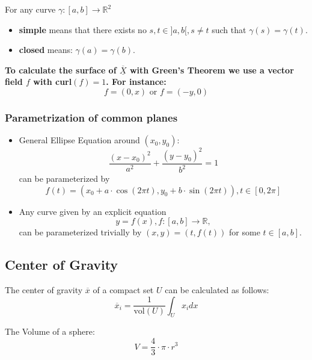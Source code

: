 \documentclass[a4paper,fontsize = 10pt]{article}
\def\R{\mathbb{R}}
\def\X{\underline{\overline{X}}}
\begin{document}
For any curve $\gamma: [a,b] \to \R^2$ 
\begin{itemize}
  \item \textbf{simple} means that there exists no $s, t \in ]a,b[, s \neq t$ such that $\gamma(s) = \gamma(t)$. 
  \item \textbf{closed} means: $\gamma(a) = \gamma(b)$.
\end{itemize}
\textbf{To calculate the surface of $\X$ with Green's Theorem we use a vector field $f$ with curl$(f) = 1$. For instance: \[f = (0,x) \text{ or } f = (-y, 0)\]}

\subsubsection*{Parametrization of common planes}
\begin{itemize}
  \item General Ellipse Equation around $(x_0, y_0)$: $$\frac{(x-x_0)^2}{a^2} + \frac{(y-y_0)^2}{b^2} = 1$$ can be parameterized by $$f(t) = (x_0 + a \cdot \cos(2\pi t), y_0 + b \cdot \sin(2\pi t)), t \in [0, 2\pi]$$
  \item Any curve given by an explicit equation $$y = f(x), f: [a,b] \to \R,$$ can be parameterized trivially by $(x, y) = (t, f(t))$ for some $t \in [a, b]$.
\end{itemize}

\subsection{Center of Gravity}
The center of gravity $\overline{x}$ of a compact set $U$ can be calculated as follows:
$$\overline{x}_i = \frac{1}{\text{vol}(U)} \int_U x_i d x$$

The Volume of a sphere: 
$$V= \frac{4}{3} \cdot \pi \cdot r^3$$
\end{document}
